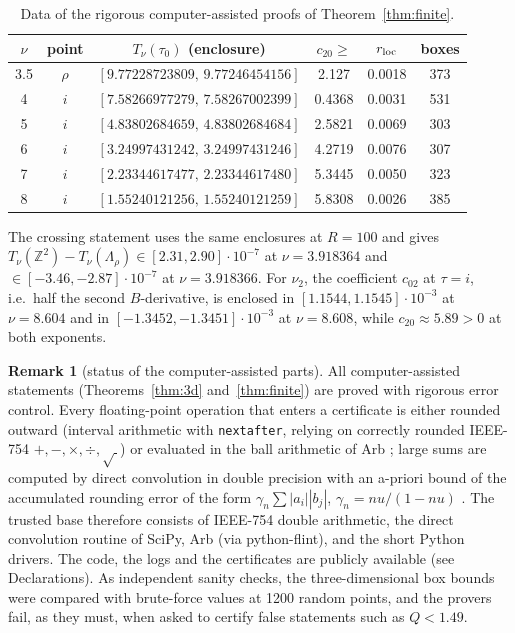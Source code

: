 \documentclass[10pt,twocolumn,a4paper]{article}
\theoremstyle{definition}
\newtheorem{remark}{Remark}
\newcommand{\Z}{\mathbb{Z}}
\begin{document}
\begin{table}[t]
\caption{Data of the rigorous computer-assisted proofs of Theorem~\ref{thm:finite}.}
\label{tab:finite}\centering\footnotesize
\setlength{\tabcolsep}{3.2pt}
\begin{tabular}{@{}cccccc@{}}\toprule
$\nu$ & point & $T_\nu(\tau_0)$ (enclosure) & $c_{20}\ge$ & $r_{\rm loc}$ & boxes\\\midrule
3.5 & $\rho$ & $[9.77228723809,\,9.77246454156]$ & 2.127 & 0.0018 & 373\\
4 & $i$ & $[7.58266977279,\,7.58267002399]$ & 0.4368 & 0.0031 & 531\\
5 & $i$ & $[4.83802684659,\,4.83802684684]$ & 2.5821 & 0.0069 & 303\\
6 & $i$ & $[3.24997431242,\,3.24997431246]$ & 4.2719 & 0.0076 & 307\\
7 & $i$ & $[2.23344617477,\,2.23344617480]$ & 5.3445 & 0.0050 & 323\\
8 & $i$ & $[1.55240121256,\,1.55240121259]$ & 5.8308 & 0.0026 & 385\\\bottomrule
\end{tabular}
\end{table}

The crossing statement uses the same enclosures at $R=100$ and gives $T_\nu(\Z^2)-T_\nu(\Lambda_\rho)\in[2.31,2.90]\cdot10^{-7}$ at $\nu=3.918364$ and $\in[-3.46,-2.87]\cdot10^{-7}$ at $\nu=3.918366$. For $\nu_2$, the coefficient $c_{02}$ at $\tau=i$, i.e.\ half the second $B$-derivative, is enclosed in $[1.1544,1.1545]\cdot10^{-3}$ at $\nu=8.604$ and in $[-1.3452,-1.3451]\cdot10^{-3}$ at $\nu=8.608$, while $c_{20}\approx5.89>0$ at both exponents.

\begin{remark}[status of the computer-assisted parts]
All computer-assisted statements (Theorems~\ref{thm:3d} and~\ref{thm:finite}) are proved with rigorous error control. Every floating-point operation that enters a certificate is either rounded outward (interval arithmetic with \texttt{nextafter}, relying on correctly rounded IEEE-754 $+,-,\times,\div,\sqrt{\ }$) or evaluated in the ball arithmetic of Arb \cite{Arb}; large sums are computed by direct convolution in double precision with an a-priori bound of the accumulated rounding error of the form $\gamma_n\sum|a_i||b_j|$, $\gamma_n=nu/(1-nu)$ \cite{Higham}. The trusted base therefore consists of IEEE-754 double arithmetic, the direct convolution routine of SciPy, Arb (via python-flint), and the short Python drivers. The code, the logs and the certificates are publicly available (see Declarations). As independent sanity checks, the three-dimensional box bounds were compared with brute-force values at 1200 random points, and the provers fail, as they must, when asked to certify false statements such as $Q<1.49$.
\end{remark}
\end{document}
